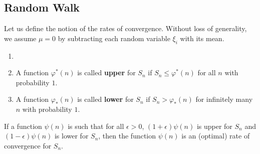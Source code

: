 \subsection{Random Walk}


Let us define the notion of the rates of convergence. Without loss of generality, we assume $\mu = 0$ by subtracting each random variable $\xi_i$ with its mean.
\begin{definition}
\begin{enumerate}
    \item[]
    \item A function $\varphi^*(n)$ is called \textbf{upper} for $S_n$ if $S_n \le \varphi^*(n)$ for all $n$ with probability $1$.
    \item A function $\varphi_*(n)$ is called \textbf{lower} for $S_n$ if $S_n > \varphi_*(n)$ for infinitely many $n$ with probability $1$.
\end{enumerate}

If a function $\psi(n)$ is such that for all $\epsilon > 0$, $(1+\epsilon)\psi(n)$ is upper for $S_n$ and $(1-\epsilon)\psi(n)$ is lower for $S_n$, then the function $\psi(n)$ is an (optimal) rate of convergence for $S_n$.
\end{definition}

